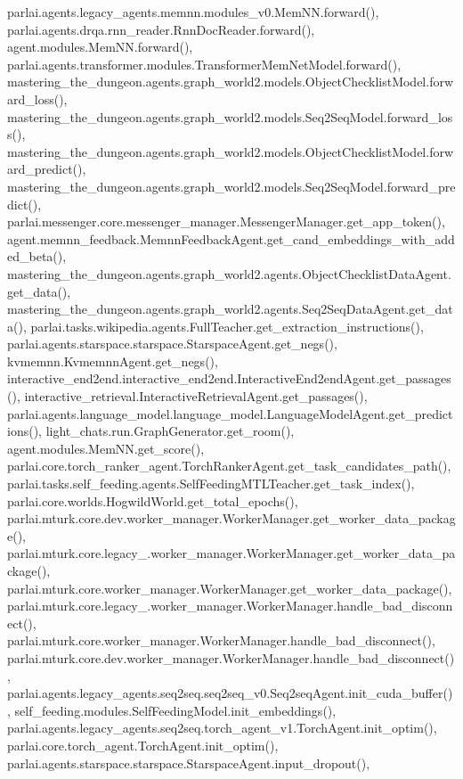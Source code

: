 parlai.\+agents.\+legacy\+\_\+agents.\+memnn.\+modules\+\_\+v0.\+Mem\+N\+N.\+forward(), parlai.\+agents.\+drqa.\+rnn\+\_\+reader.\+Rnn\+Doc\+Reader.\+forward(), agent.\+modules.\+Mem\+N\+N.\+forward(), parlai.\+agents.\+transformer.\+modules.\+Transformer\+Mem\+Net\+Model.\+forward(), mastering\+\_\+the\+\_\+dungeon.\+agents.\+graph\+\_\+world2.\+models.\+Object\+Checklist\+Model.\+forward\+\_\+loss(), mastering\+\_\+the\+\_\+dungeon.\+agents.\+graph\+\_\+world2.\+models.\+Seq2\+Seq\+Model.\+forward\+\_\+loss(), mastering\+\_\+the\+\_\+dungeon.\+agents.\+graph\+\_\+world2.\+models.\+Object\+Checklist\+Model.\+forward\+\_\+predict(), mastering\+\_\+the\+\_\+dungeon.\+agents.\+graph\+\_\+world2.\+models.\+Seq2\+Seq\+Model.\+forward\+\_\+predict(), parlai.\+messenger.\+core.\+messenger\+\_\+manager.\+Messenger\+Manager.\+get\+\_\+app\+\_\+token(), agent.\+memnn\+\_\+feedback.\+Memnn\+Feedback\+Agent.\+get\+\_\+cand\+\_\+embeddings\+\_\+with\+\_\+added\+\_\+beta(), mastering\+\_\+the\+\_\+dungeon.\+agents.\+graph\+\_\+world2.\+agents.\+Object\+Checklist\+Data\+Agent.\+get\+\_\+data(), mastering\+\_\+the\+\_\+dungeon.\+agents.\+graph\+\_\+world2.\+agents.\+Seq2\+Seq\+Data\+Agent.\+get\+\_\+data(), parlai.\+tasks.\+wikipedia.\+agents.\+Full\+Teacher.\+get\+\_\+extraction\+\_\+instructions(), parlai.\+agents.\+starspace.\+starspace.\+Starspace\+Agent.\+get\+\_\+negs(), kvmemnn.\+Kvmemnn\+Agent.\+get\+\_\+negs(), interactive\+\_\+end2end.\+interactive\+\_\+end2end.\+Interactive\+End2end\+Agent.\+get\+\_\+passages(), interactive\+\_\+retrieval.\+Interactive\+Retrieval\+Agent.\+get\+\_\+passages(), parlai.\+agents.\+language\+\_\+model.\+language\+\_\+model.\+Language\+Model\+Agent.\+get\+\_\+predictions(), light\+\_\+chats.\+run.\+Graph\+Generator.\+get\+\_\+room(), agent.\+modules.\+Mem\+N\+N.\+get\+\_\+score(), parlai.\+core.\+torch\+\_\+ranker\+\_\+agent.\+Torch\+Ranker\+Agent.\+get\+\_\+task\+\_\+candidates\+\_\+path(), parlai.\+tasks.\+self\+\_\+feeding.\+agents.\+Self\+Feeding\+M\+T\+L\+Teacher.\+get\+\_\+task\+\_\+index(), parlai.\+core.\+worlds.\+Hogwild\+World.\+get\+\_\+total\+\_\+epochs(), parlai.\+mturk.\+core.\+dev.\+worker\+\_\+manager.\+Worker\+Manager.\+get\+\_\+worker\+\_\+data\+\_\+package(), parlai.\+mturk.\+core.\+legacy\+\_.\+worker\+\_\+manager.\+Worker\+Manager.\+get\+\_\+worker\+\_\+data\+\_\+package(), parlai.\+mturk.\+core.\+worker\+\_\+manager.\+Worker\+Manager.\+get\+\_\+worker\+\_\+data\+\_\+package(), parlai.\+mturk.\+core.\+legacy\+\_.\+worker\+\_\+manager.\+Worker\+Manager.\+handle\+\_\+bad\+\_\+disconnect(), parlai.\+mturk.\+core.\+worker\+\_\+manager.\+Worker\+Manager.\+handle\+\_\+bad\+\_\+disconnect(), parlai.\+mturk.\+core.\+dev.\+worker\+\_\+manager.\+Worker\+Manager.\+handle\+\_\+bad\+\_\+disconnect(), parlai.\+agents.\+legacy\+\_\+agents.\+seq2seq.\+seq2seq\+\_\+v0.\+Seq2seq\+Agent.\+init\+\_\+cuda\+\_\+buffer(), self\+\_\+feeding.\+modules.\+Self\+Feeding\+Model.\+init\+\_\+embeddings(), parlai.\+agents.\+legacy\+\_\+agents.\+seq2seq.\+torch\+\_\+agent\+\_\+v1.\+Torch\+Agent.\+init\+\_\+optim(), parlai.\+core.\+torch\+\_\+agent.\+Torch\+Agent.\+init\+\_\+optim(), parlai.\+agents.\+starspace.\+starspace.\+Starspace\+Agent.\+input\+\_\+dropout(), 